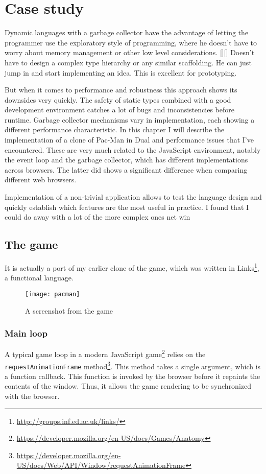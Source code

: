 \chapter{Case study}\label{chap:case}
Dynamic languages with a garbage collector have the advantage of letting the
programmer use the exploratory style of programming, where he doesn't have to
worry about memory management or other low level considerations. [][] Doesn't
have to design a complex type hierarchy or any similar scaffolding. He can just
jump in and start implementing an idea. This is excellent for prototyping.

But when it comes to performance and robustness this approach shows its
downsides very quickly. The safety of static types combined with a good
development environment catches a lot of bugs and inconsistencies before
runtime. Garbage collector mechanisms vary in implementation, each showing a
different performance characteristic. In this chapter I will describe the
implementation of a clone of Pac-Man in Dual and performance issues that I've
encountered. These are very much related to the JavaScript environment, notably
the event loop and the garbage collector, which has different implementations
across browsers. The latter did shows a significant difference when comparing
different web browsers.

Implementation of a non-trivial application allows to test the language design
and quickly establish which features are the most useful in practice.  I found
that I could do away with a lot of the more complex ones %
net win

\section{The game}
It is actually a port of my earlier clone of the game, which was written in
Links\footnote{\url{http://groups.inf.ed.ac.uk/links/}}, a functional language.

\begin{figure}[h!]
\centering \texttt{[image: pacman]}
\caption{A screenshot from the game}
\label{fig:pacman}
\end{figure}

\subsection{Main loop}
A typical game loop in a modern JavaScript
game\footnote{\url{https://developer.mozilla.org/en-US/docs/Games/Anatomy}}
relies on the \texttt{requestAnimationFrame}
method\footnote{\url{https://developer.mozilla.org/en-US/docs/Web/API/Window/requestAnimationFrame}}. This
method takes a single argument, which is a function callback. This function is
invoked by the browser before it repaints the contents of the window. Thus, it
allows the game rendering to be synchronized with the browser.

